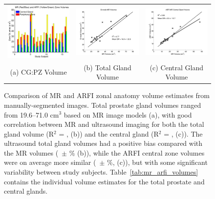 \begin{figure}[htb!]
\centering
\begin{tabular}{ccc}
\includegraphics[width=0.3\linewidth]{figs/mr_arfi_volumes} &
\includegraphics[width=0.3\linewidth]{figs/mr_arfi_total_linreg} &
\includegraphics[width=0.3\linewidth]{figs/mr_arfi_central_linreg} \\
(a) CG:PZ Volume & (b) Total Gland Volume & (c) Central Gland Volume \\
\end{tabular}
\caption{Comparison of MR and ARFI zonal anatomy volume estimates from
    manually-segmented images.  Total prostate gland volumes ranged from
    19.6--71.0 cm$^3$ based on MR image models (a), with good correlation
    between MR and ultrasound imaging for both the total gland volume (R$^2$ =
    \MRarfiVolTotalRsq, (b)) and the central gland (R$^2$ =
    \MRarfiVolCentralRsq, (c)).  The ultrasound total gland volumes had a positive
    bias compared with the MR volumes (\MRarfiVolTotalMeanDiff~$\pm$
    \MRarfiVolTotalStdDiff\% (b)), while the ARFI central zone volumes were on
    average more similar (\MRarfiVolCentralMeanDiff~$\pm$
    \MRarfiVolCentralStdDiff\%, (c)), but with some significant variability
    between study subjects.  Table~\ref{tab:mr_arfi_volumes} contains the
    individual volume estimates for the total prostate and central glands.}
\label{fig:mr_arfi_volumes} 
\end{figure}
